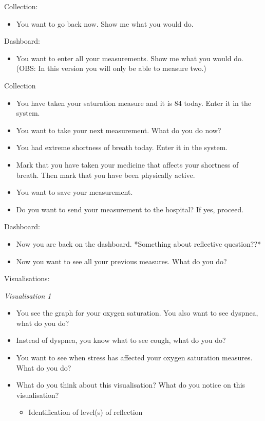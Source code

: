 Collection: 
\begin{itemize}
\item You want to go back now. Show me what you would do.
\end{itemize}

Dashboard:
\begin{itemize}
\item You want to enter all your measurements. Show me what you would do. (OBS: In this version you will only be able to measure two.)
\end{itemize}

Collection
\begin{itemize}
\item You have taken your saturation measure and it is 84 today. Enter it in the system.
\item You want to take your next measurement. What do you do now?
\item You had extreme shortness of breath today. Enter it in the system.
\item Mark that you have taken your medicine that affects your shortness of breath. Then mark that you have been physically active.
\item You want to save your measurement.
\item Do you want to send your measurement to the hospital? If yes, proceed.
\end{itemize}

Dashboard:
\begin{itemize}
\item Now you are back on the dashboard. *Something about reflective question??*
\item Now you want to see all your previous measures. What do you do?
\end{itemize}

Visualisations:

\textit{\small Visualisation 1}
\begin{itemize}
\item You see the graph for your oxygen saturation. You also want to see dyspnea, what do you do?
\item Instead of dyspnea, you know what to see cough, what do you do?
\item You want to see when stress has affected your oxygen saturation measures. What do you do?
\item What do you think about this visualisation? What do you notice on this visualisation?
\begin{itemize}
 \item Identification of level(s) of reflection
 \end{itemize}
\end{itemize}



